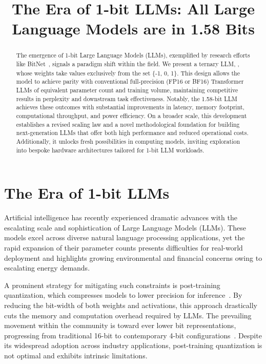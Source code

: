 \title{The Era of 1-bit LLMs: All Large Language Models are in 1.58 Bits}

\begin{abstract}
The emergence of 1-bit Large Language Models (LLMs), exemplified by research efforts like BitNet~\cite{bitnet}, signals a paradigm shift within the field. We present a ternary LLM, \textbf{}, whose weights take values exclusively from the set \{-1, 0, 1\}. This design allows the model to achieve parity with conventional full-precision (FP16 or BF16) Transformer LLMs of equivalent parameter count and training volume, maintaining competitive results in perplexity and downstream task effectiveness. Notably, the 1.58-bit LLM achieves these outcomes with substantial improvements in latency, memory footprint, computational throughput, and power efficiency. On a broader scale, this development establishes a revised scaling law and a novel methodological foundation for building next-generation LLMs that offer both high performance and reduced operational costs. Additionally, it unlocks fresh possibilities in computing models, inviting exploration into bespoke hardware architectures tailored for 1-bit LLM workloads.
\end{abstract}

\section{The Era of 1-bit LLMs}

Artificial intelligence has recently experienced dramatic advances with the escalating scale and sophistication of Large Language Models (LLMs). These models excel across diverse natural language processing applications, yet the rapid expansion of their parameter counts presents difficulties for real-world deployment and highlights growing environmental and financial concerns owing to escalating energy demands.

A prominent strategy for mitigating such constraints is post-training quantization, which compresses models to lower precision for inference~\cite{smoothquant, gptq, quip, quip_sharp}. By reducing the bit-width of both weights and activations, this approach drastically cuts the memory and computation overhead required by LLMs. The prevailing movement within the community is toward ever lower bit representations, progressing from traditional 16-bit to contemporary 4-bit configurations~\cite{gptq, awq}. Despite its widespread adoption across industry applications, post-training quantization is not optimal and exhibits intrinsic limitations.


